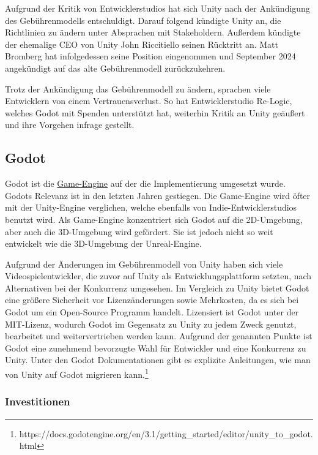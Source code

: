 Aufgrund der Kritik von Entwicklerstudios hat sich Unity nach der Ank\"{u}ndigung des Geb\"{u}hrenmodells entschuldigt. Darauf folgend k\"{u}ndigte Unity an, die Richtlinien zu \"{a}ndern unter Absprachen mit Stakeholdern.\autocite{golem2} Au\ss{}erdem k\"{u}ndigte der ehemalige CEO von Unity John Riccitiello seinen R\"{u}cktritt an.\autocite{golem5} Matt Bromberg hat infolgedessen seine Position eingenommen und September 2024 angek\"{u}ndigt auf das alte Geb\"{u}hrenmodell zur\"{u}ckzukehren.\autocite{unity1}

Trotz der Ank\"{u}ndigung das Geb\"{u}hrenmodell zu \"{a}ndern, sprachen viele Entwicklern von einem Vertrauensverlust. So hat Entwicklerstudio Re-Logic, welches Godot mit Spenden unterst\"{u}tzt hat, weiterhin Kritik an Unity ge\"{a}u\ss{}ert und ihre Vorgehen infrage gestellt.\autocite{golem3}

\subsection{Godot}
\label{chap:sota godot}

Godot ist die \hyperref[chap:game engines]{Game-Engine} auf der die Implementierung umgesetzt wurde. Godots Relevanz ist in den letzten Jahren gestiegen. Die Game-Engine wird \"{o}fter mit der Unity-Engine verglichen, welche ebenfalls von Indie-Entwicklerstudios benutzt wird. Als Game-Engine konzentriert sich Godot auf die 2D-Umgebung, aber auch die 3D-Umgebung wird gef\"{o}rdert. Sie ist jedoch nicht so weit entwickelt wie die 3D-Umgebung der Unreal-Engine.

Aufgrund der \"{A}nderungen im Geb\"{u}hrenmodell von Unity haben sich viele Videospielentwickler, die zuvor auf Unity als Entwicklungsplattform setzten, nach Alternativen bei der Konkurrenz umgesehen. Im Vergleich zu Unity bietet Godot eine gr\"{o}\ss{}ere Sicherheit vor Lizenz\"{a}nderungen sowie Mehrkosten, da es sich bei Godot um ein Open-Source Programm handelt. Lizensiert ist Godot unter der MIT-Lizenz, wodurch Godot im Gegensatz zu Unity zu jedem Zweck genutzt, bearbeitet und weitervertrieben werden kann.\autocite{golem4} Aufgrund der genannten Punkte ist Godot eine zunehmend bevorzugte Wahl f\"{u}r Entwickler und eine Konkurrenz zu Unity. Unter den Godot Dokumentationen gibt es explizite Anleitungen, wie man von Unity auf Godot migrieren kann.\footnote{https://docs.godotengine.org/en/3.1/getting_started/editor/unity_to_godot.html}

\subsubsection{Investitionen}
\label{chap:godot investitionen}


